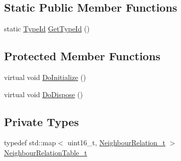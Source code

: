 \subsection*{Static Public Member Functions}
\begin{DoxyCompactItemize}
\item 
static \hyperlink{classns3_1_1TypeId}{Type\+Id} \hyperlink{classns3_1_1LteAnr_a656ceb99d5b4cac521839c29c81d68ac}{Get\+Type\+Id} ()
\end{DoxyCompactItemize}
\subsection*{Protected Member Functions}
\begin{DoxyCompactItemize}
\item 
virtual void \hyperlink{classns3_1_1LteAnr_a734219c83a371c70dbffea2c7febc0d5}{Do\+Initialize} ()
\item 
virtual void \hyperlink{classns3_1_1LteAnr_a8fdcd520ddb394361ce66342e3ad799c}{Do\+Dispose} ()
\end{DoxyCompactItemize}
\subsection*{Private Types}
\begin{DoxyCompactItemize}
\item 
typedef std\+::map$<$ uint16\+\_\+t, \hyperlink{structns3_1_1LteAnr_1_1NeighbourRelation__t}{Neighbour\+Relation\+\_\+t} $>$ \hyperlink{classns3_1_1LteAnr_aac9b97c306ecc1d3d75ab85c32ba2bfc}{Neighbour\+Relation\+Table\+\_\+t}
\end{DoxyCompactItemize}
